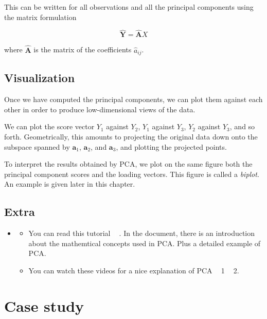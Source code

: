 \documentclass[]{book}
\newenvironment{rmdblock}[1]
  {\begin{shaded*}
  \begin{itemize}
  \renewcommand{\labelitemi}{
    \raisebox{-.7\height}[0pt][0pt]{
      {\setkeys{Gin}{width=2em,keepaspectratio}\texttt{[image: img/icons/\#1]}}
    }
  }
  \item
  }
  {
  \end{itemize}
  \end{shaded*}
  }
\newenvironment{rmdinsight}
  {\begin{rmdblock}{insight}}
  {\end{rmdblock}}
\begin{document}
This can be written for all observations and all the principal
components using the matrix formulation

\[ \mathbf{\hat{Y}} = \mathbf{\hat{A}} X\]

where \(\mathbf{\hat{A}}\) is the matrix of the coefficients
\(\hat{a}_{ij}\).

\subsection*{Visualization}\label{visualization}

Once we have computed the principal components, we can plot them against
each other in order to produce low-dimensional views of the data.

We can plot the score vector \(Y_1\) against \(Y_2\), \(Y_1\) against
\(Y_3\), \(Y_2\) against \(Y_3\), and so forth. Geometrically, this
amounts to projecting the original data down onto the subspace spanned
by \(\mathbf{a}_1\), \(\mathbf{a}_2\), and \(\mathbf{a}_3\), and
plotting the projected points.

To interpret the results obtained by PCA, we plot on the same figure
both the principal component scores and the loading vectors. This figure
is called a \emph{biplot}. An example is given later in this chapter.

\subsection*{Extra}\label{extra}

\begin{rmdinsight}
\begin{itemize}
\item
  You can read this tutorial
  \textcolor{white}{[}\faFilePdfO\textcolor{white}{]} . In the document,
  there is an introduction about the mathemtical concepts used in PCA.
  Plus a detailed example of PCA.
\item
  You can watch these videos for a nice explanation of PCA
  \textcolor{white}{[}\faVideoCamera\textcolor{white}{]} 1
  \textcolor{white}{[}\faVideoCamera\textcolor{white}{]} 2.
\end{itemize}
\end{rmdinsight}

\section{Case study}\label{case-study}
\end{document}
